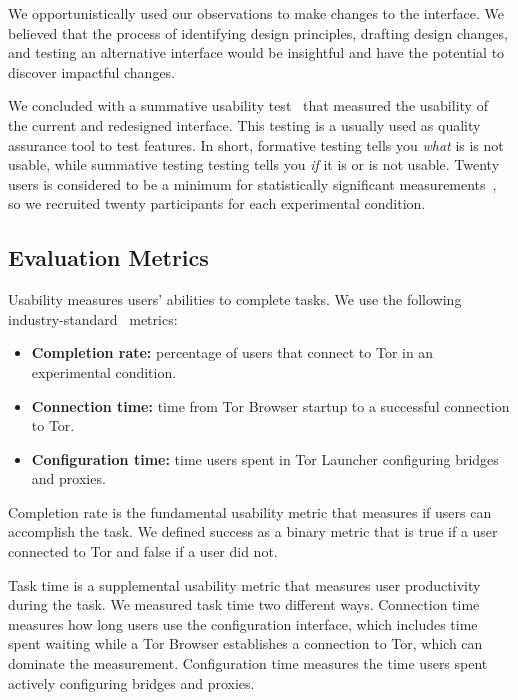 \documentclass[USenglish,oneside,twocolumn]{article}
\begin{document}
We opportunistically used our observations to make changes to the interface. We believed that the process of identifying design principles, drafting design changes, and testing an alternative interface would be insightful and have the potential to discover impactful changes.

We concluded with a summative usability test~\cite{summative} that measured the usability of the current and redesigned interface. This testing is a usually used as quality assurance tool to test features. In short, formative testing tells you {\it what} is is not usable, while summative testing testing tells you {\it if} it is or is not usable. Twenty users is considered to be a minimum for statistically significant measurements~\cite{howmanyusers}, so we recruited twenty participants for each experimental condition.  

\subsection{Evaluation Metrics}
\label{sec:eval}
Usability measures users' abilities to complete tasks. We use the following industry-standard~\cite{albert2013measuring} metrics: \\

\begin{itemize}
\item {\bfseries Completion rate:}  percentage of users that connect to Tor in an experimental condition. 
\item {\bfseries Connection time:} time from Tor Browser startup to a successful connection to Tor. 
\item {\bfseries Configuration time:} time users spent in Tor Launcher configuring bridges and proxies.
\end{itemize}

Completion rate is the fundamental usability metric that measures if users can accomplish the task. We defined success as a binary metric that is true if a user connected to Tor and false if a user did not. 

Task time is a supplemental usability metric that measures user productivity during the task. We measured task time two different ways. Connection time measures how long users use the configuration interface, which includes time  spent waiting while a Tor Browser establishes a connection to Tor, which can dominate the measurement. Configuration time measures the time users spent actively configuring bridges and proxies. 
\end{document}
